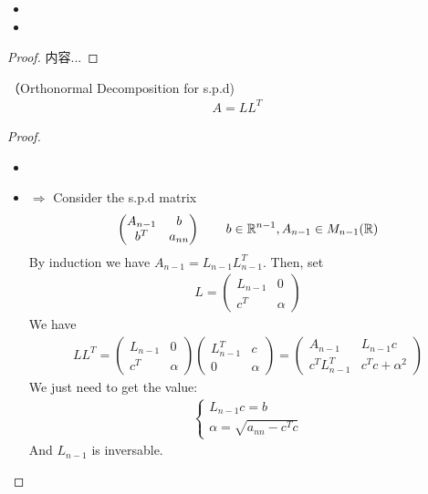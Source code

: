 \documentclass[Total.tex]{subfiles}
\begin{document}
			\begin{proposition}
				\begin{itemize}
					\item 
					\item 
				\end{itemize}
			\end{proposition}
			\begin{proof}
				内容...
			\end{proof}
			\begin{proposition}
				（Orthonormal Decomposition for s.p.d) 
				\begin{gather*}
					A=LL^T
				\end{gather*}
			\end{proposition}
			\begin{proof}
				\begin{itemize}
					\item 
					\item $\Rightarrow$ Consider the s.p.d matrix
					\begin{gather*}
						\begin{pmatrix}
							A_{n-1}&b\\
							b^T&a_{nn}
						\end{pmatrix}\qquad b\in \mathbb{R}^{n-1},A_{n-1}\in M_{n-1}(\mathbb{R})
					\end{gather*}
					By induction we have $A_{n-1}=L_{n-1}L_{n-1}^T$. Then, set
					\begin{gather*}
						L=\begin{pmatrix}
							L_{n-1}&0\\
							c^T&\alpha
						\end{pmatrix}
					\end{gather*}
					We have
					\begin{gather*}
						LL^T=\begin{pmatrix}
							L_{n-1}&0\\
							c^T&\alpha
						\end{pmatrix}\begin{pmatrix}
							L_{n-1}^T&c\\
							0&\alpha
						\end{pmatrix}=\begin{pmatrix}
							A_{n-1}&L_{n-1}c\\
							c^TL_{n-1}^T&c^Tc+\alpha^2
						\end{pmatrix}
					\end{gather*}
					We just need to get the value:
					\begin{gather*}
						\begin{cases}
							L_{n-1}c=b\\
							\alpha=\sqrt{a_{nn}-c^Tc}
						\end{cases}
					\end{gather*}
					And $L_{n-1}$ is inversable.
				\end{itemize}
			\end{proof}
\end{document}

